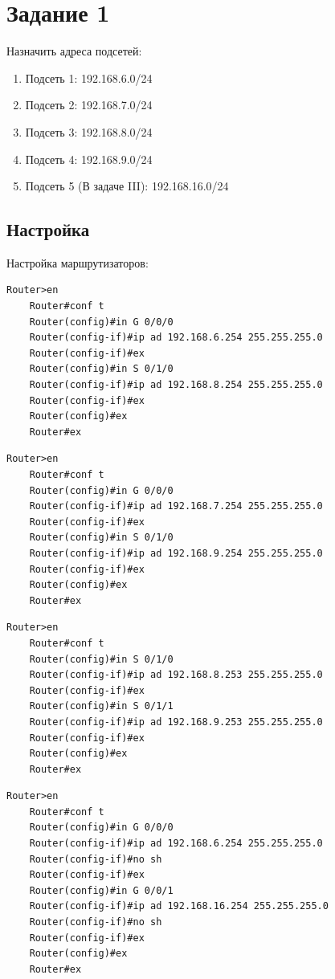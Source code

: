 \documentclass[a4paper,oneside,12pt]{extreport}
\begin{document}


\tableofcontents

\chapter{Задание 1}

Назначить адреса подсетей:
\begin{enumerate}
	\item Подсеть 1: 192.168.6.0/24
	\item Подсеть 2: 192.168.7.0/24
	\item Подсеть 3: 192.168.8.0/24
	\item Подсеть 4: 192.168.9.0/24
	\item Подсеть 5 (В задаче III): 192.168.16.0/24
\end{enumerate}

\section{Настройка}

Настройка маршрутизаторов:

\begin{lstlisting}[gobble=8, caption=Настройка маршрутизатора Router0]
	Router>en
	Router#conf t
	Router(config)#in G 0/0/0
	Router(config-if)#ip ad 192.168.6.254 255.255.255.0
	Router(config-if)#ex
	Router(config)#in S 0/1/0
	Router(config-if)#ip ad 192.168.8.254 255.255.255.0
	Router(config-if)#ex
	Router(config)#ex
	Router#ex
\end{lstlisting}

\begin{lstlisting}[gobble=8, caption=Настройка маршрутизатора Router1]
	Router>en
	Router#conf t
	Router(config)#in G 0/0/0
	Router(config-if)#ip ad 192.168.7.254 255.255.255.0
	Router(config-if)#ex
	Router(config)#in S 0/1/0
	Router(config-if)#ip ad 192.168.9.254 255.255.255.0
	Router(config-if)#ex
	Router(config)#ex
	Router#ex
\end{lstlisting}

\begin{lstlisting}[gobble=8, caption=Настройка маршрутизатора Router2]
	Router>en
	Router#conf t
	Router(config)#in S 0/1/0
	Router(config-if)#ip ad 192.168.8.253 255.255.255.0
	Router(config-if)#ex
	Router(config)#in S 0/1/1
	Router(config-if)#ip ad 192.168.9.253 255.255.255.0
	Router(config-if)#ex
	Router(config)#ex
	Router#ex
\end{lstlisting}

\begin{lstlisting}[gobble=8, caption=Настройка маршрутизатора Router7]
	Router>en
	Router#conf t
	Router(config)#in G 0/0/0
	Router(config-if)#ip ad 192.168.6.254 255.255.255.0
	Router(config-if)#no sh
	Router(config-if)#ex
	Router(config)#in G 0/0/1
	Router(config-if)#ip ad 192.168.16.254 255.255.255.0
	Router(config-if)#no sh
	Router(config-if)#ex
	Router(config)#ex
	Router#ex
\end{lstlisting}
\end{document}
